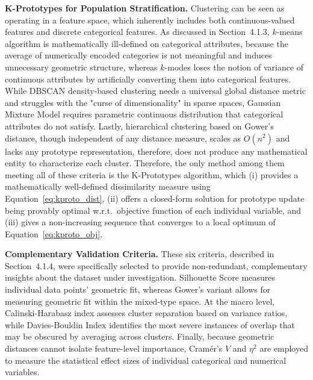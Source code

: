 \textbf{K-Prototypes for Population Stratification.} Clustering can be seen as operating in a feature space, which inherently includes both continuous-valued features and discrete categorical features. As discussed in Section~4.1.3, $k$-means algorithm is mathematically ill-defined on categorical attributes, because the average of numerically encoded categories is not meaningful and induces unnecessary geometric structure, whereas $k$-modes loses the notion of variance of continuous attributes by artificially converting them into categorical features. While DBSCAN density-based clustering needs a universal global distance metric and struggles with the "curse of dimensionality" in sparse spaces, Gaussian Mixture Model requires parametric continuous distribution that categorical attributes do not satisfy. Lastly, hierarchical clustering based on Gower's distance, though independent of any distance measure, scales as $O(n^2)$ and lacks any prototype representation, therefore, does not produce any mathematical entity to characterize each cluster. Therefore, the only method among them meeting all of these criteria is the K-Prototypes algorithm, which (i) provides a mathematically well-defined dissimilarity measure using Equation~\eqref{eq:kproto_dist}, (ii) offers a closed-form solution for prototype update being provably optimal w.r.t.\ objective function of each individual variable, and (iii) gives a non-increasing sequence that converges to a local optimum of Equation~\eqref{eq:kproto_obj}.

\textbf{Complementary Validation Criteria.} These six criteria, described in Section~4.1.4, were specifically selected to provide non-redundant, complementary insights about the dataset under investigation. Silhouette Score measures individual data points' geometric fit, whereas Gower's variant allows for measuring geometric fit within the mixed-type space. At the macro level, Calinski-Harabasz index assesses cluster separation based on variance ratios, while Davies-Bouldin Index identifies the most severe instances of overlap that may be obscured by averaging across clusters. Finally, because geometric distances cannot isolate feature-level importance, Cramér's $V$ and $\eta^2$ are employed to measure the statistical effect sizes of individual categorical and numerical variables.

